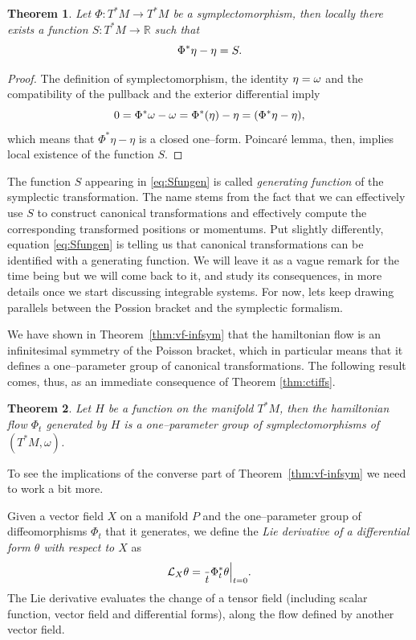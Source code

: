 \documentclass[english,fontsize=11pt,paper=a5,oneside]{scrbook}
\newcommand{\cL}{\mathcal{L}}
\newcommand{\R}{\mathbb{R}}
\let\d\relax
\newcommand{\d}{\mathrm{d}}
\newtheorem{theorem}{Theorem}[chapter]
\theoremstyle{definition}
\begin{document}
\begin{theorem}\label{thm:genfun}
  Let $\Phi: T^*M \to T^*M$ be a symplectomorphism, then locally there exists a function $S:T^*M\to\R$ such that
  \begin{equation}\label{eq:Sfungen}
    \Phi^*\eta - \eta = \d S.
  \end{equation}
\end{theorem}
\begin{proof}
  The definition of symplectomorphism, the identity $\d\eta = \omega$ and the compatibility of the pullback and the exterior differential imply
  \begin{equation}
    0 = \Phi^*\omega - \omega = \Phi^*(\d\eta) - \d\eta = \d(\Phi^*\eta - \eta),
  \end{equation}
  which means that $\Phi^*\eta - \eta$ is a closed one--form.
  Poincar\'e lemma, then, implies local existence of the function $S$.
\end{proof}

The function $S$ appearing in \eqref{eq:Sfungen} is called \emph{generating function} of the symplectic transformation.
The name stems from the fact that we can effectively use $S$ to construct canonical transformations and effectively compute the corresponding transformed positions or momentums.
Put slightly differently, equation \eqref{eq:Sfungen} is telling us that canonical transformations can be identified with a generating function.
We will leave it as a vague remark for the time being but we will come back to it, and study its consequences, in more details once we start discussing integrable systems.
For now, lets keep drawing parallels between the Possion bracket and the symplectic formalism.

We have shown in Theorem~\ref{thm:vf-infsym} that the hamiltonian flow is an infinitesimal symmetry of the Poisson bracket, which in particular means that it defines a one--parameter group of canonical transformations.
The following result comes, thus, as an immediate consequence of Theorem \ref{thm:ctiffs}.

\begin{theorem}
  Let $H$ be a function on the manifold $T^*M$, then the hamiltonian flow $\Phi_t$ generated by $H$ is a one--parameter group of symplectomorphisms of $(T^*M, \omega)$.
\end{theorem}

To see the implications of the converse part of Theorem~\ref{thm:vf-infsym} we need to work a bit more.

Given a vector field $X$ on a manifold $P$ and the one--parameter group of diffeomorphisms $\Phi_t$ that it generates, we define the \emph{Lie derivative of a differential form $\theta$ with respect to $X$} as
\begin{equation}
  \cL_X \theta = \frac{\d}{\d t}\Phi_t^*\theta \Big|_{t=0}.
\end{equation}
The Lie derivative evaluates the change of a tensor field (including scalar function, vector field and differential forms), along the flow defined by another vector field.
\end{document}
